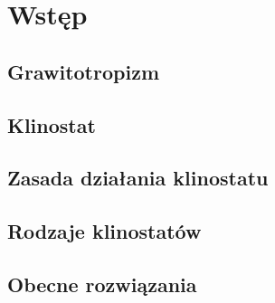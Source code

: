 \chapter{Wstęp}

\section{Grawitotropizm}

\section{Klinostat}

\section{Zasada działania klinostatu}

\section{Rodzaje klinostatów}

\section{Obecne rozwiązania}